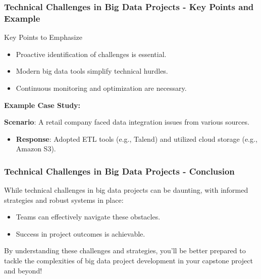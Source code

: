 \documentclass[aspectratio=169]{beamer}
\begin{document}
\begin{frame}[fragile]
    \frametitle{Technical Challenges in Big Data Projects - Key Points and Example}
    
    \begin{block}{Key Points to Emphasize}
        \begin{itemize}
            \item Proactive identification of challenges is essential.
            \item Modern big data tools simplify technical hurdles.
            \item Continuous monitoring and optimization are necessary.
        \end{itemize}
    \end{block}
    
    \textbf{Example Case Study:}
    \smallskip
    
    \textbf{Scenario}: A retail company faced data integration issues from various sources.
    
    \begin{itemize}
        \item \textbf{Response}: Adopted ETL tools (e.g., Talend) and utilized cloud storage (e.g., Amazon S3).
    \end{itemize}
\end{frame}

\begin{frame}[fragile]
    \frametitle{Technical Challenges in Big Data Projects - Conclusion}
    
    While technical challenges in big data projects can be daunting, with informed strategies and robust systems in place:
    
    \begin{itemize}
        \item Teams can effectively navigate these obstacles.
        \item Success in project outcomes is achievable.
    \end{itemize}
    
    By understanding these challenges and strategies, you'll be better prepared to tackle the complexities of big data project development in your capstone project and beyond!
\end{frame}
\end{document}
